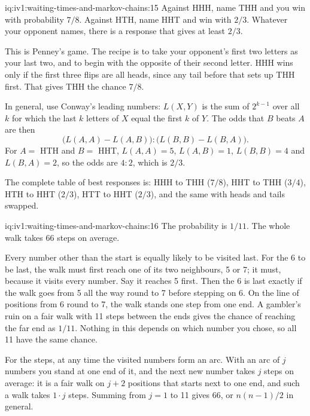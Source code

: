 \begin{solution}{iq:iv1:waiting-times-and-markov-chains:15}
Against HHH, name THH and you win with probability $7/8$. Against HTH, name HHT and win with $2/3$. Whatever your opponent names, there is a response that gives at least $2/3$.

This is Penney's game. The recipe is to take your opponent's first two letters as your last two, and to begin with the opposite of their second letter. HHH wins only if the first three flips are all heads, since any tail before that sets up THH first. That gives THH the chance $7/8$.

In general, use Conway's leading numbers: $L(X, Y)$ is the sum of $2^{k-1}$ over all $k$ for which the last $k$ letters of $X$ equal the first $k$ of $Y$. The odds that $B$ beats $A$ are then
\[
\bigl(L(A, A) - L(A, B)\bigr) : \bigl(L(B, B) - L(B, A)\bigr).
\]
For $A = $ HTH and $B = $ HHT, $L(A, A) = 5$, $L(A, B) = 1$, $L(B, B) = 4$ and $L(B, A) = 2$, so the odds are $4:2$, which is $2/3$.

The complete table of best responses is: HHH to THH ($7/8$), HHT to THH ($3/4$), HTH to HHT ($2/3$), HTT to HHT ($2/3$), and the same with heads and tails swapped.

\end{solution}

\begin{solution}{iq:iv1:waiting-times-and-markov-chains:16}
The probability is $1/11$. The whole walk takes $66$ steps on average.

Every number other than the start is equally likely to be visited last. For the 6 to be last, the walk must first reach one of its two neighbours, 5 or 7; it must, because it visits every number. Say it reaches 5 first. Then the 6 is last exactly if the walk goes from 5 all the way round to 7 before stepping on 6. On the line of positions from 6 round to 7, the walk stands one step from one end. A gambler's ruin on a fair walk with 11 steps between the ends gives the chance of reaching the far end as $1/11$. Nothing in this depends on which number you chose, so all 11 have the same chance.

For the steps, at any time the visited numbers form an arc. With an arc of $j$ numbers you stand at one end of it, and the next new number takes $j$ steps on average: it is a fair walk on $j + 2$ positions that starts next to one end, and such a walk takes $1 \cdot j$ steps. Summing from $j = 1$ to 11 gives $66$, or $n(n-1)/2$ in general.

\end{solution}

